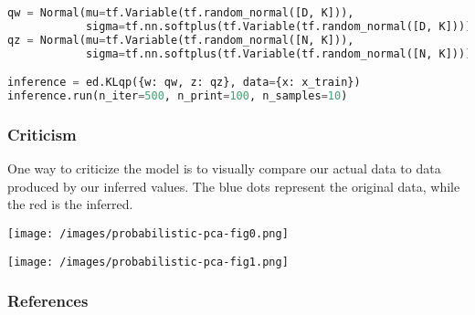 \begin{lstlisting}[language=Python]
qw = Normal(mu=tf.Variable(tf.random_normal([D, K])),
            sigma=tf.nn.softplus(tf.Variable(tf.random_normal([D, K]))))
qz = Normal(mu=tf.Variable(tf.random_normal([N, K])),
            sigma=tf.nn.softplus(tf.Variable(tf.random_normal([N, K]))))

inference = ed.KLqp({w: qw, z: qz}, data={x: x_train})
inference.run(n_iter=500, n_print=100, n_samples=10)
\end{lstlisting}

\subsubsection{Criticism}

One way to criticize the model is to visually compare our actual data
to data produced by our inferred values. The blue dots represent the
original data, while the red is the inferred.

\texttt{[image: /images/probabilistic-pca-fig0.png]}

\texttt{[image: /images/probabilistic-pca-fig1.png]}

\subsubsection{References}\label{references}
